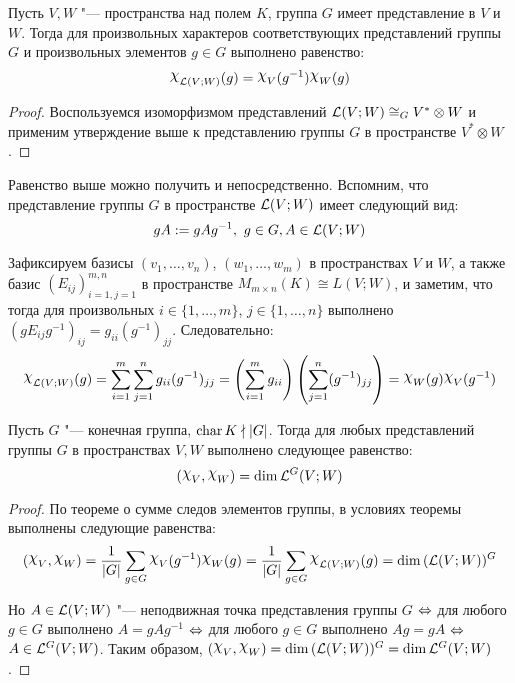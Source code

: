 \begin{corollary}
	Пусть $V, W$ "--- пространства над полем $K$, группа $G$ имеет представление в $V$ и $W$. Тогда для произвольных характеров соответствующих представлений группы $G$ и произвольных элементов $g \in G$ выполнено равенство:
	\[\Chi_{\mc L(V ; W)}(g) = \Chi_V(g^{-1})\Chi_W(g)\]
\end{corollary}

\begin{proof}
	Воспользуемся изоморфизмом представлений $\mathcal L(V; W) \cong_G V^* \otimes W$ и применим утверждение выше к представлению группы $G$ в пространстве $V^* \otimes W$.
\end{proof}

\begin{note}
	Равенство выше можно получить и непосредственно. Вспомним, что представление группы $G$ в пространстве $\mathcal L(V; W)$ имеет следующий вид:
	\[gA := gAg^{-1},~g \in G, A \in \mathcal L(V; W)\]
	
	Зафиксируем базисы $(v_1, \dotsc, v_n)$, $(w_1, \dotsc, w_m)$ в пространствах $V$ и $W$, а также базис $(E_{ij})_{i = 1, j = 1}^{m, n}$ в пространстве $M_{m \times n}(K) \cong L(V; W)$, и заметим, что тогда для произвольных $i \in \{1, \dotsc, m\}$, $j \in \{1, \dotsc, n\}$ выполнено $(gE_{ij}g^{-1})_{ij} = g_{ii}(g^{-1})_{jj}$. Следовательно:
	\[\Chi_{\mc L(V; W)}(g) = \sum_{i = 1}^{m}\sum_{j = 1}^{n}g_{ii}(g^{-1})_{jj} = \left(\sum_{i = 1}^{m}g_{ii}\right)\left(\sum_{j = 1}^{n}(g^{-1})_{jj}\right) = \Chi_W(g)\Chi_V(g^{-1})\]
\end{note}

\begin{theorem}
	Пусть $G$ "--- конечная группа, $\operatorname{char}{K} \nmid |G|$. Тогда для любых представлений группы $G$ в пространствах $V, W$ выполнено следующее равенство:
	\[(\Chi_{V}, \Chi_{W}) = \dim \mc L^G(V; W)\]
\end{theorem}

\begin{proof}
	По теореме о сумме следов элементов группы, в условиях теоремы выполнены следующие равенства:
	\[(\Chi_{V}, \Chi_{W}) = \frac1{|G|}\sum_{g \in G}\Chi_{V}(g^{-1})\Chi_{W}(g) = \frac1{|G|}\sum_{g \in G}\Chi_{\mc L(V; W)}(g) = \dim{(\mc L(V; W))^G}\]
	
	Но $A \in \mathcal L(V; W)$ "--- неподвижная точка представления группы $G$ $\Leftrightarrow$ для любого $g \in G$ выполнено $A = gAg^{-1}$ $\Leftrightarrow$ для любого $g \in G$ выполнено $Ag = gA$ $\Leftrightarrow$ $A \in \mathcal L^G(V; W)$. Таким образом, $(\Chi_{V}, \Chi_{W}) = \dim{(\mc L(V; W))^G} = \dim \mc L^G(V; W)$.
\end{proof}

